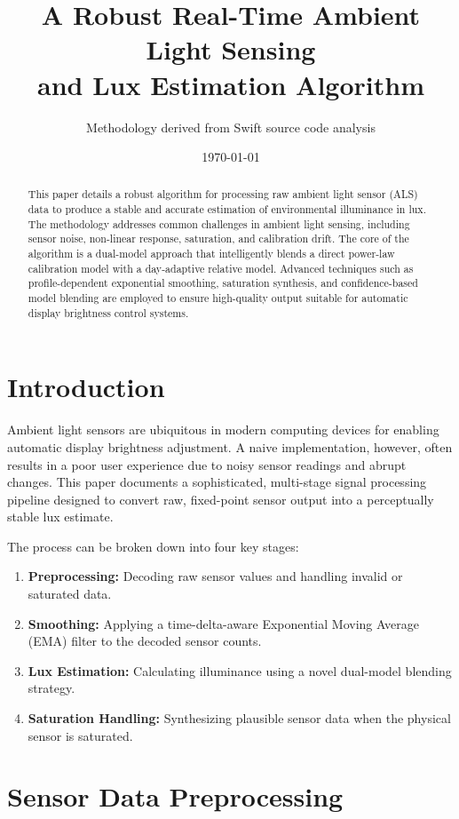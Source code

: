\documentclass{article}
\title{A Robust Real-Time Ambient Light Sensing \\ and Lux Estimation Algorithm}
\author{Methodology derived from Swift source code analysis}
\date{\today}
\begin{document}
\maketitle

\begin{abstract}
This paper details a robust algorithm for processing raw ambient light sensor (ALS) data to produce a stable and accurate estimation of environmental illuminance in lux. The methodology addresses common challenges in ambient light sensing, including sensor noise, non-linear response, saturation, and calibration drift. The core of the algorithm is a dual-model approach that intelligently blends a direct power-law calibration model with a day-adaptive relative model. Advanced techniques such as profile-dependent exponential smoothing, saturation synthesis, and confidence-based model blending are employed to ensure high-quality output suitable for automatic display brightness control systems.
\end{abstract}

\section{Introduction}
Ambient light sensors are ubiquitous in modern computing devices for enabling automatic display brightness adjustment. A naive implementation, however, often results in a poor user experience due to noisy sensor readings and abrupt changes. This paper documents a sophisticated, multi-stage signal processing pipeline designed to convert raw, fixed-point sensor output into a perceptually stable lux estimate.

The process can be broken down into four key stages:
\begin{enumerate}
    \item \textbf{Preprocessing:} Decoding raw sensor values and handling invalid or saturated data.
    \item \textbf{Smoothing:} Applying a time-delta-aware Exponential Moving Average (EMA) filter to the decoded sensor counts.
    \item \textbf{Lux Estimation:} Calculating illuminance using a novel dual-model blending strategy.
    \item \textbf{Saturation Handling:} Synthesizing plausible sensor data when the physical sensor is saturated.
\end{enumerate}

\section{Sensor Data Preprocessing}
\end{document}
